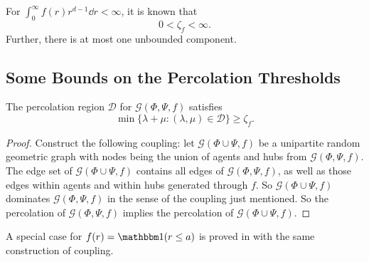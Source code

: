  For $\int_{0}^{\infty}f(r)r^{d-1}\dd r<\infty$,  it is known that \cite[Chapter 6]{MeesterRonald1996CP}
  \[
  0<  \zeta_f<\infty.
    \] 
    Further, there is at most one unbounded component.  


 
   
    
   
    
    \subsection{Some Bounds on the Percolation Thresholds}
 

    
        \begin{lemma}  
    The percolation region $\mathcal{D}$ for $\mathcal{G}(\Phi,\Psi,f)$ satisfies 
\begin{equation}
\min\{\lambda+\mu\colon (\lambda,\mu)\in \mathcal{D}\}\geq \zeta_f.
\end{equation}
    \end{lemma}
\begin{proof}
        Construct the following coupling: let $\mathcal{G}\left(\Phi\cup\Psi,f\right)$ be a unipartite random geometric graph with nodes  being the union of agents and hubs from $\mathcal{G}\left(\Phi,\Psi,f\right)$. The edge set of $\mathcal{G}\left(\Phi\cup\Psi,f\right)$ contains all edges of $\mathcal{G}\left(\Phi,\Psi,f\right)$, as well as those edges within agents and within hubs generated through $f$. So  $\mathcal{G}\left(\Phi\cup\Psi,f\right)$ dominates $\mathcal{G}\left(\Phi,\Psi,f\right)$ in the sense of the coupling just mentioned. So the percolation of $\mathcal{G}\left(\Phi,\Psi,f\right)$ implies the percolation of  $\mathcal{G}\left(\Phi\cup\Psi,f\right)$.
\end{proof}  
\begin{remark}
A special case for $f(r) = \ind (r\leq a) $ is proved in \cite{iyer2012percolation} with the same construction of coupling.    
\end{remark}

